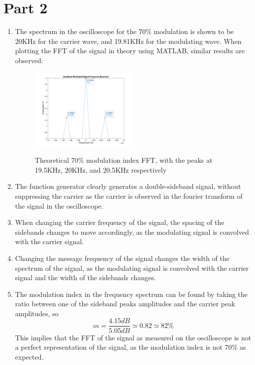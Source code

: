 \section{Part 2}
\begin{enumerate}
    \item The spectrum in the oscilloscope for the 70\% modulation is shown to be 20KHz for the carrier wave, and 19.81KHz for the modulating wave. When plotting the FFT of the signal in theory using MATLAB, similar results are observed:
          \begin{figure}[H]
              \centering
              \includegraphics[width=0.5\textwidth]{images/evaluation_part2.png}
              \label{fig:evaluation_part2}
              \caption{Theoretical 70\% modulation index FFT, with the peaks at 19.5KHz, 20KHz, and 20.5KHz respectively}
          \end{figure}
    \item The function generator clearly generates a double-sideband signal, without suppressing the carrier as the carrier is observed in the fourier transform of the signal in the oscilloscope.
    \item When changing the carrier frequency of the signal, the spacing of the sidebands changes to move accordingly, as the modulating signal is convolved with the carrier signal.
    \item Changing the message frequency of the signal changes the width of the spectrum of the signal, as the modulating signal is convolved with the carrier signal and the width of the sidebands changes.
    \item The modulation index in the frequency spectrum can be found by taking the ratio between one of the sideband peaks amplitudes and the carrier peak amplitudes, so
          \begin{equation}
              m = \frac{4.15dB}{5.05dB} \simeq 0.82 \simeq 82\%
          \end{equation}
          This implies that the FFT of the signal as measured on the oscilloscope is not a perfect representation of the signal, as the modulation index is not 70\% as expected.
\end{enumerate}

